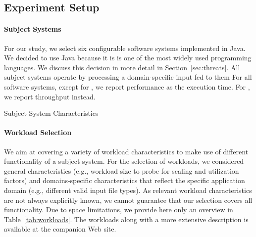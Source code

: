 \subsection{Experiment Setup}\label{sec:setup}
\paragraph{Subject Systems}
For our study, we select six configurable software systems implemented in Java. We decided to use Java because it is is one of the most widely used programming languages. We discuss this decision in more detail in Section~\ref{sec:threats}. 
All subject systems operate by processing a domain-specific input fed to them
For all software systems, except for \htwo, we report performance as the execution time. For \htwo, we report throughput instead. 

\begin{table}
	\footnotesize
	\centering
	\caption{Subject System Characteristics}
	
	\label{tab:subject_systems}
\end{table}
\paragraph{Workload Selection}
We aim at covering a variety of workload characteristics to make use of different functionality of a subject system. For the selection of workloads, we considered general characteristics (e.g., workload size to probe for scaling and utilization factors) and domains-specific characteristics that reflect the specific application domain (e.g., different valid input file types). As relevant workload characteristics are not always explicitly known, we cannot guarantee that our selection covers all functionality.
Due to space limitations, we provide here only an overview in Table~\ref{tab:workloads}. The workloads along with a more extensive description is available at the companion Web site. 

